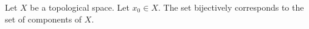 \begin{lemma} \label{lemma:zeroth_homotopy_set_of_a_topological_space_at_any_point_corresponds_to_path_components}
    Let $X$ be a topological space. Let $x_0 \in X$. 
    The set  bijectively corresponds to the set of  components of $X$.  
\end{lemma}